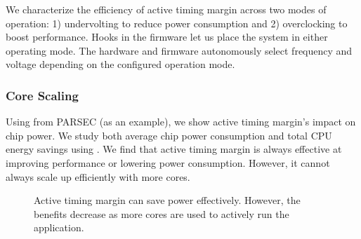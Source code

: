 We characterize the efficiency of active timing margin across two modes of operation: 1) undervolting to reduce power consumption and 2) overclocking to boost performance. Hooks in the firmware let us place the system in either operating mode. The hardware and firmware autonomously select frequency and voltage depending on the configured operation mode.

\subsubsection{Core Scaling}
\label{sec:ams:characterization:scaling-trends}
Using  from PARSEC (as an example), we show active timing margin's impact on chip power. We study both average chip power consumption and total CPU energy savings using . We find that active timing margin is always effective at improving performance or lowering power consumption. However, it cannot always scale up efficiently with more cores. 

\begin{figure}[t]
	\centering
    \caption{Active timing margin can save power effectively. However, the benefits decrease as more cores are used to actively run the application.}
    \label{fig:raytrace-inefficiency}
\end{figure}

